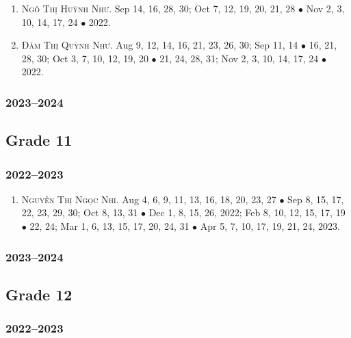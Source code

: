 \documentclass{article}
\begin{document}
\begin{enumerate}
	\item \textsc{Ngô Thị Huỳnh Như.} {\sf[In]} Sep 14, 16, 28, 30; Oct 7, 12, 19, 20, 21, 28 $\bullet$ Nov 2, 3, 10, 14, 17, 24 $\bullet$ 2022. {\sf[Out]}
	\item \textsc{Đàm Thị Quỳnh Như.} {\sf[In]} Aug 9, 12, 14, 16, 21, 23, 26, 30; Sep 11, 14 $\bullet$ 16, 21, 28, 30; Oct 3, 7, 10, 12, 19, 20 $\bullet$ 21, 24, 28, 31; Nov 2, 3, 10, 14, 17, 24 $\bullet$ 2022. {\sf[Out]}
\end{enumerate}

\subsubsection{2023--2024}


\subsection{Grade 11}

\subsubsection{2022--2023}

\begin{enumerate}
	\item \textsc{Nguyễn Thị Ngọc Nhi.} {\sf[In]} Aug 4, 6, 9, 11, 13, 16, 18, 20, 23, 27 $\bullet$ Sep 8, 15, 17, 22, 23, 29, 30; Oct 8, 13, 31 $\bullet$ Dec 1, 8,  15, 26, 2022; Feb 8, 10, 12, 15, 17, 19 $\bullet$ 22, 24; Mar 1, 6, 13, 15, 17, 20, 24, 31 $\bullet$ Apr 5, 7, 10, 17, 19, 21, 24, 2023.
\end{enumerate}

\subsubsection{2023--2024}


\subsection{Grade 12}

\subsubsection{2022--2023}
\end{document}

